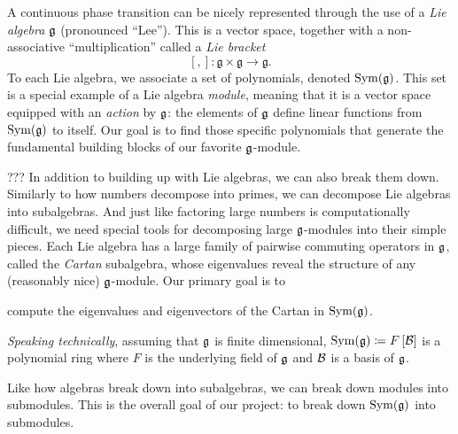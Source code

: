 \documentclass[11pt, reqno]{amsart}
\begin{document}
A continuous phase transition can be nicely represented through the use of a \emph{Lie algebra} $\mathfrak{g}$ (pronounced ``Lee''). This is a vector space, together with a non-associative ``multiplication'' called a \emph{Lie bracket}
\[[,]: \mathfrak{g} \times \mathfrak{g} \rightarrow \mathfrak{g}.\]
To each Lie algebra, we associate a set of polynomials, denoted $\operatorname{Sym}(\mathfrak{g})$. This set is a special example of a Lie algebra \emph{module}, meaning that it is a vector space equipped with an \emph{action} by $\mathfrak{g}$: the elements of $\mathfrak{g}$ define linear functions from $\operatorname{Sym}(\mathfrak{g})$ to itself. Our goal is to find those specific polynomials that generate the fundamental building blocks of our favorite $\mathfrak{g}$-module.


??? In addition to building up with Lie algebras, we can also break them down.
Similarly to how numbers decompose into primes, we can decompose Lie algebras into subalgebras. And just like factoring large numbers is computationally difficult, we need special tools for decomposing large $\mathfrak{g}$-modules into their simple pieces. Each Lie algebra has a large family of pairwise commuting operators in $\mathfrak{g}$, called the \emph{Cartan} subalgebra, whose eigenvalues reveal the structure of any (reasonably nice) $\mathfrak{g}$-module. Our primary goal is to
\begin{center} compute the eigenvalues and eigenvectors of the Cartan in $\operatorname{Sym}(\mathfrak{g})$. \end{center}




%
%

%
%
%

\emph{Speaking technically}, assuming that $\mathfrak{g}$ is finite dimensional, $\operatorname{Sym}(\mathfrak{g})\coloneqq F\left[ \mathcal{B} \right]$ 
is a polynomial ring where $F$ is the underlying field of $\mathfrak{g}$ and $\mathcal{B}$ is a basis of $\mathfrak{g}$.



Like how algebras break down into subalgebras, we can break down modules into
submodules. This is the overall goal of our project: to break down $\operatorname{Sym}(\mathfrak{g})$
into submodules.
\end{document}
